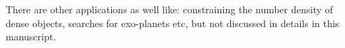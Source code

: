 There are other applications as well like: constraining the number density of dense objects, searches
for exo-planets etc, but not discussed in details in this manuscript. 

